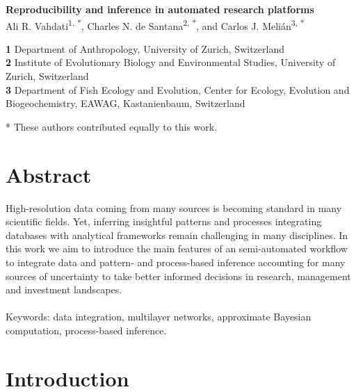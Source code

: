 \documentclass[english,12pt]{article}
\date{}
\begin{document}
\begin{flushleft}
  \textbf{\Large Reproducibility and inference in automated research platforms}\\
  \vspace{0.5cm} Ali R. Vahdati\textsuperscript{1, *}, \vspace{0.5cm}
  Charles N. de Santana\textsuperscript{2, *}, and Carlos
  J. Meli\'an\textsuperscript{3, *}

\textbf{1} Department of Anthropology, University of Zurich, Switzerland\\
\textbf{2} Institute of Evolutionary Biology and Environmental Studies, University of Zurich, Switzerland\\
\textbf{3} Department of Fish Ecology and Evolution, Center for Ecology, Evolution and Biogeochemistry, EAWAG, Kastanienbaum, Switzerland
\\
\bigskip
\end{flushleft}
* These authors contributed equally to this work.\\
\newpage


\tableofcontents
\newpage

\section{Abstract}
High-resolution data coming from many sources is becoming standard in
many scientific fields. Yet, inferring insightful patterns and
processes integrating databases with analytical frameworks remain
challenging in many disciplines. In this work we aim to introduce the
main features of an semi-automated workflow to integrate data and
pattern- and process-based inference accounting for many sources of
uncertainty to take better informed decisions in research, management
and investment landscapes.
\\
\\
Keywords: data integration, multilayer networks, approximate Bayesian
computation, process-based inference.
\newpage


\section{Introduction}

\end{document}
